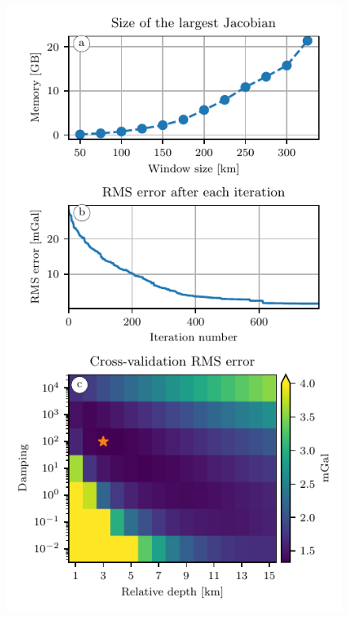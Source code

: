 \begin{figure}[tbh!]
    \makeatletter%
    \if@twocolumn%
        \includegraphics[width=\linewidth]{figs/eql-gradient-boosted/australia-memory-cv-error.pdf}
    \else%
        \centering

\end{figure}
